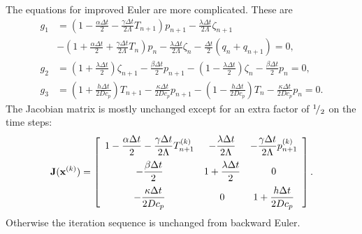 The equations for improved Euler are more complicated. These are
\begin{subequations}
\begin{align}
  g_1 &= \left( 1 - \frac{\alpha \Delta t}{2} - \frac{ \gamma \Delta t }{ 2 \Lambda } T_{n+1} \right) p_{n+1} - \frac{\lambda \Delta t}{2 \Lambda} \zeta_{n+1} \nonumber \\
      &- \left( 1 + \frac{\alpha \Delta t}{2} + \frac{ \gamma \Delta t }{ 2 \Lambda } T_{n} \right) p_{n} - \frac{\lambda \Delta t}{2 \Lambda} \zeta_{n}  
       - \frac{\Delta t}{2} ( q_n + q_{n+1} ) = 0, \\
  g_2 &= \left( 1 + \frac{\lambda \Delta t}{2} \right) \zeta_{n+1} - \frac{\beta \Delta t}{2} p_{n+1} 
       - \left( 1 - \frac{\lambda \Delta t}{2} \right) \zeta_n - \frac{\beta \Delta t}{2} p_{n} = 0, \\
  g_3 &= \left( 1 + \frac{h \Delta t}{ 2 D c_p } \right) T_{n+1} - \frac{\kappa \Delta t}{2 D c_p } p_{n+1} 
       - \left( 1 - \frac{h \Delta t}{ 2 D c_p } \right) T_n - \frac{\kappa \Delta t}{2 D c_p } p_n = 0.
\end{align}
\end{subequations}
The Jacobian matrix is mostly unchanged except for an extra factor of ${}^{1}\!/_{2}$ on the time steps:
\begin{align}
  \mathbf{J}(\mathbf{x}^{(k)})  = \left[ \begin{array}{c c c}
   1 - \dfrac{\alpha \Delta t}{2} - \dfrac{ \gamma \Delta t }{ 2\Lambda } T_{n+1}^{(k)} & - \dfrac{\lambda \Delta t}{2\Lambda} & - \dfrac{ \gamma \Delta t }{ 2\Lambda } p_{n+1}^{(k)} \vspace{0.2cm} \\
   - \dfrac{\beta \Delta t}{2} & 1 + \dfrac{\lambda \Delta t}{2}  & 0 \vspace{0.2cm} \\
    - \dfrac{\kappa \Delta t}{2 D c_p } & 0 & 1 + \dfrac{h \Delta t}{ 2 D c_p }  \end{array} \right] .
\end{align}
Otherwise the iteration sequence is unchanged from backward Euler.

